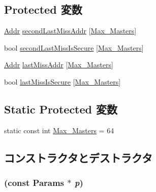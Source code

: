 \subsection*{Protected 変数}
\begin{DoxyCompactItemize}
\item 
\hyperlink{base_2types_8hh_af1bb03d6a4ee096394a6749f0a169232}{Addr} \hyperlink{classGHBPrefetcher_ac6c833cc27241202aa468eebe86fe416}{secondLastMissAddr} \mbox{[}\hyperlink{classGHBPrefetcher_aa47b9a2122dc34206b458cf67c489ffa}{Max\_\-Masters}\mbox{]}
\item 
bool \hyperlink{classGHBPrefetcher_a7fa6cd326e4e080df811a14e8ad1672c}{secondLastMissIsSecure} \mbox{[}\hyperlink{classGHBPrefetcher_aa47b9a2122dc34206b458cf67c489ffa}{Max\_\-Masters}\mbox{]}
\item 
\hyperlink{base_2types_8hh_af1bb03d6a4ee096394a6749f0a169232}{Addr} \hyperlink{classGHBPrefetcher_aec5636c0f993d0ece1344ced66e8f8d6}{lastMissAddr} \mbox{[}\hyperlink{classGHBPrefetcher_aa47b9a2122dc34206b458cf67c489ffa}{Max\_\-Masters}\mbox{]}
\item 
bool \hyperlink{classGHBPrefetcher_a9feb025f0d9475b0ba61ef4a78c6ddc9}{lastMissIsSecure} \mbox{[}\hyperlink{classGHBPrefetcher_aa47b9a2122dc34206b458cf67c489ffa}{Max\_\-Masters}\mbox{]}
\end{DoxyCompactItemize}
\subsection*{Static Protected 変数}
\begin{DoxyCompactItemize}
\item 
static const int \hyperlink{classGHBPrefetcher_aa47b9a2122dc34206b458cf67c489ffa}{Max\_\-Masters} = 64
\end{DoxyCompactItemize}


\subsection{コンストラクタとデストラクタ}
\hypertarget{classGHBPrefetcher_aa168ac6ebc7ff59b10e32694370dd402}{
\subsubsection[{GHBPrefetcher}]{ (const {\bf Params} $\ast$ {\em p})}}
\label{classGHBPrefetcher_aa168ac6ebc7ff59b10e32694370dd402}



